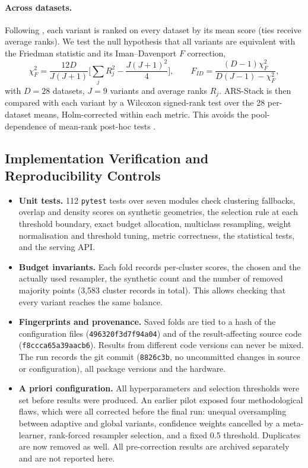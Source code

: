 \documentclass[11pt,a4paper]{article}
\begin{document}
\paragraph{Across datasets.} Following \cite{demsar2006statistical,benavoli2016posthoc}, each variant is ranked on every dataset by its mean score (ties receive average ranks). We test the null hypothesis that all variants are equivalent with the Friedman statistic and its Iman--Davenport $F$ correction,
\begin{equation}
\chi_F^2=\frac{12D}{J(J+1)}\Big[\sum_{j}R_j^2-\frac{J(J+1)^2}{4}\Big],\qquad F_{ID}=\frac{(D-1)\chi_F^2}{D(J-1)-\chi_F^2},\label{eq:friedman}
\end{equation}
with $D=28$ datasets, $J=9$ variants and average ranks $R_j$. ARS-Stack is then compared with each variant by a Wilcoxon signed-rank test over the 28 per-dataset means, Holm-corrected within each metric. This avoids the pool-dependence of mean-rank post-hoc tests \cite{benavoli2016posthoc}.

\subsection{Implementation Verification and Reproducibility Controls}

\begin{itemize}
  \item \textbf{Unit tests.} 112 \texttt{pytest} tests over seven modules check clustering fallbacks, overlap and density scores on synthetic geometries, the selection rule at each threshold boundary, exact budget allocation, multiclass resampling, weight normalisation and threshold tuning, metric correctness, the statistical tests, and the serving API.
  \item \textbf{Budget invariants.} Each fold records per-cluster scores, the chosen and the actually used resampler, the synthetic count and the number of removed majority points (3{,}583 cluster records in total). This allows checking that every variant reaches the same balance.
  \item \textbf{Fingerprints and provenance.} Saved folds are tied to a hash of the configuration files (\texttt{496320f3d7f94a04}) and of the result-affecting source code (\texttt{f8ccca65a39aacb6}). Results from different code versions can never be mixed. The run records the git commit (\texttt{8826c3b}, no uncommitted changes in source or configuration), all package versions and the hardware.
  \item \textbf{A priori configuration.} All hyperparameters and selection thresholds were set before results were produced. An earlier pilot exposed four methodological flaws, which were all corrected before the final run: unequal oversampling between adaptive and global variants, confidence weights cancelled by a meta-learner, rank-forced resampler selection, and a fixed 0.5 threshold. Duplicates are now removed as well. All pre-correction results are archived separately and are not reported here.
\end{itemize}
\end{document}
